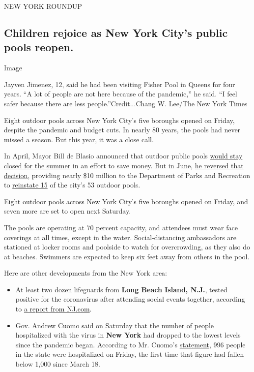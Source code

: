 NEW YORK ROUNDUP

\hypertarget{children-rejoice-as-new-york-citys-public-pools-reopen}{%
\subsection{Children rejoice as New York City's public pools
reopen.}\label{children-rejoice-as-new-york-citys-public-pools-reopen}}

Image

Jayven Jimenez, 12, said he had been visiting Fisher Pool in Queens for
four years. ``A lot of people are not here because of the pandemic,'' he
said. ``I feel safer because there are less people.''Credit...Chang W.
Lee/The New York Times

Eight outdoor pools across New York City's five boroughs opened on
Friday, despite the pandemic and budget cuts. In nearly 80 years, the
pools had never missed a season. But this year, it was a close call.

In April, Mayor Bill de Blasio announced that outdoor public pools
\href{https://www.nytimes3xbfgragh.onion/2020/04/23/nyregion/nyc-pools-schools-closed-summer.html}{would
stay closed for the summer} in an effort to save money. But in June,
\href{https://www.6sqft.com/nyc-public-pools-reopening-summer-2020/}{he
reversed that decision,} providing nearly \$10 million to the Department
of Parks and Recreation to
\href{https://www.nycgovparks.org/facilities/outdoor-pools}{reinstate
15} of the city's 53 outdoor pools.

Eight outdoor pools across New York City's five boroughs opened on
Friday, and seven more are set to open next Saturday.

The pools are operating at 70 percent capacity, and attendees must wear
face coverings at all times, except in the water. Social-distancing
ambassadors are stationed at locker rooms and poolside to watch for
overcrowding, as they also do at beaches. Swimmers are expected to keep
six feet away from others in the pool.

Here are other developments from the New York area:

\begin{itemize}
\item
  At least two dozen lifeguards from \textbf{Long Beach Island, N.J.},
  tested positive for the coronavirus after attending social events
  together, according to
  \href{https://www.nj.com/coronavirus/2020/07/20-lbi-lifeguards-test-positive-for-coronavirus-after-attending-parties-together.html}{a
  report from NJ.com}.
\item
  Gov. Andrew Cuomo said on Saturday that the number of people
  hospitalized with the virus in \textbf{New York} had dropped to the
  lowest levels since the pandemic began. According to Mr. Cuomo's
  \href{https://www.governor.ny.gov/news/governor-cuomo-announces-hospitalizations-drop-below-1000-first-time-march-18-0}{statement},
  996 people in the state were hospitalized on Friday, the first time
  that figure had fallen below 1,000 since March 18.
\end{itemize}

